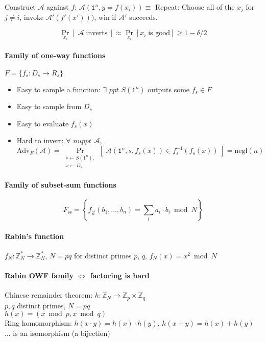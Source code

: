 \documentclass[11pt]{article}
\newcommand{\eqdef}{\ensuremath{\equiv}}
\newcommand{\ZZ}{\ensuremath{\mathds{Z}}}
\newcommand{\Adv}{\text{Adv}}
\newcommand{\nuppt}{\textit{nuppt}}
\newcommand{\negl}{\text{negl}}
\newcommand{\AAA}{\ensuremath{\mathcal{A}}}
\theoremstyle{remark}
\begin{document}
Construct $\AAA$ against $f$:
$\AAA(\texttt{1}^n, y=f(x_i))\eqdef$ Repeat: Choose all of the $x_j$ for $j \neq i$,
invoke $\AAA'(f'(x')))$, win if $\AAA'$ succeeds.

\[ \Pr_{x_i}[\;\AAA \; \text{inverts}\;] \approx \Pr_{x_i}[x_i\;\text{is good}] \ge 1-\delta/2 \]

\paragraph{Family of one-way functions}
$F = \{ f_s : D_s \rightarrow R_s \}$
\begin{itemize}
\item Easy to sample a function: $\exists$ $ppt$ $S(\texttt{1}^n)$ outputs some $f_s \in F$
\item Easy to sample from $D_s$
\item Easy to evaluate $f_s(x)$
\item Hard to invert: $\forall$ $\nuppt$ $\AAA$,
\[ \Adv_F(\AAA) = \Pr_{\substack{s\gets S(\texttt{1}^n),\\x\gets D_s}} [\;
  \AAA(\texttt{1}^n, s, f_s(x)) \in f_s^{-1}(f_s(x))
\;] = \negl(n) \]
\end{itemize}

\paragraph{Family of subset-sum functions}
\[F_{\text{ss}} = \left\{ f_{\vec{a}}(b_1,\ldots,b_n) = \sum_i a_i\cdot b_i \bmod N \right\} \]

\paragraph{Rabin's function}
$f_N : \ZZ_N^* \rightarrow \ZZ_N^*$,
$N=pq$ for distinct primes $p$, $q$,
$f_N(x)=x^2 \bmod N$

\paragraph{Rabin OWF family $\iff$ factoring is hard}

Chinese remainder theorem:
$h: \ZZ_N \to \ZZ_p \times \ZZ_q$\\
$p,q$ distinct primes, $N=pq$\\
$h(x) = (x \bmod p, x \bmod q)$ \\
Ring homomorphism: $h(x\cdot y) = h(x) \cdot h(y)$, $h(x+y) = h(x) + h(y)$\\
... is an isomorphism (a bijection)
\end{document}
